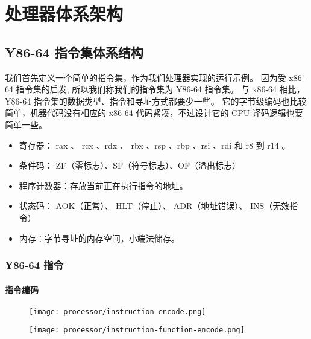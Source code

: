 \section{处理器体系架构}

\subsection{Y86-64 指令集体系结构}

我们首先定义一个简单的指令集，作为我们处理器实现的运行示例。
因为受 x86-64 指令集的启发, 所以我们称我们的指令集为 Y86-64 指令集。
与 x86-64 相比， Y86-64 指令集的数据类型、指令和寻址方式都要少一些。
它的字节级编码也比较简单，机器代码没有相应的 x86-64 代码紧凑，不过设计它的 CPU 译码逻辑也要简单一些。
\begin{itemize}
    \item 寄存器： rax 、 rcx 、rdx 、 rbx 、rsp 、rbp 、rsi 、rdi 和 r8 到 r14 。
    \item 条件码： ZF（零标志）、SF（符号标志）、OF（溢出标志）
    \item 程序计数器：存放当前正在执行指令的地址。
    \item 状态码： AOK（正常）、 HLT（停止）、 ADR（地址错误）、 INS（无效指令）
    \item 内存：字节寻址的内存空间，小端法储存。
\end{itemize}

\subsubsection{Y86-64 指令}
\paragraph{指令编码}
\begin{figure}[H]
    \centering
    \texttt{[image: processor/instruction-encode.png]}
\end{figure}
\begin{figure}[H]
    \centering
    \texttt{[image: processor/instruction-function-encode.png]}
\end{figure}

